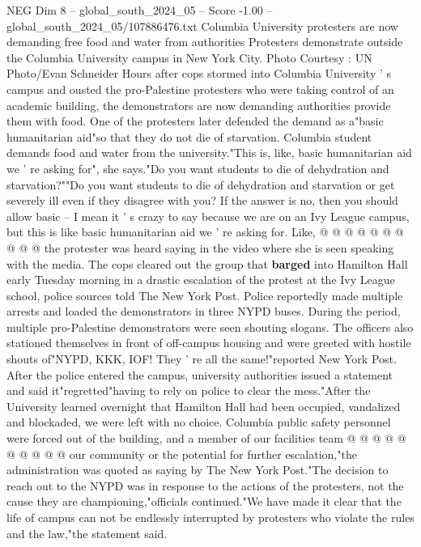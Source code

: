 \begin{textsample}{NEG Dim 8 – global\_south\_2024\_05 – Score -1.00 – global\_south\_2024\_05/107886476.txt}  \label{ex:f8_neg_100}
Columbia University protesters are now demanding free food and water from authorities Protesters demonstrate outside the Columbia University campus in New York City.
Photo Courtesy : UN Photo/Evan Schneider Hours after cops stormed into Columbia University ' s campus and ousted the pro-Palestine protesters who were taking control of an academic building, the demonstrators are now demanding authorities provide them with food.
One of the protesters later defended the demand as a"basic humanitarian aid"so that they do not die of starvation.
Columbia student demands food and water from the university."This is, like, basic humanitarian aid we ' re asking for", she says."Do you want students to die of dehydration and starvation?""Do you want students to die of dehydration and starvation or get severely ill even if they disagree with you?
If the answer is no, then you should allow basic -- I mean it ' s crazy to say because we are on an Ivy League campus, but this is like basic humanitarian aid we ' re asking for.
Like, @ @ @ @ @ @ @ @ @ @ the protester was heard saying in the video where she is seen speaking with the media.
The cops cleared out the group that \textbf{barged} into Hamilton Hall early Tuesday morning in a drastic escalation of the protest at the Ivy League school, police sources told The New York Post.
Police reportedly made multiple arrests and loaded the demonstrators in three NYPD buses.
During the period, multiple pro-Palestine demonstrators were seen shouting slogans.
The officers also stationed themselves in front of off-campus housing and were greeted with hostile shouts of"NYPD, KKK, IOF!
They ' re all the same!"reported New York Post.
After the police entered the campus, university authorities issued a statement and said it"regretted"having to rely on police to clear the mess."After the University learned overnight that Hamilton Hall had been occupied, vandalized and blockaded, we were left with no choice.
Columbia public safety personnel were forced out of the building, and a member of our facilities team @ @ @ @ @ @ @ @ @ @ our community or the potential for further escalation,"the administration was quoted as saying by The New York Post."The decision to reach out to the NYPD was in response to the actions of the protesters, not the cause they are championing,"officials continued."We have made it clear that the life of campus can not be endlessly interrupted by protesters who violate the rules and the law,"the statement said.

\end{textsample}
